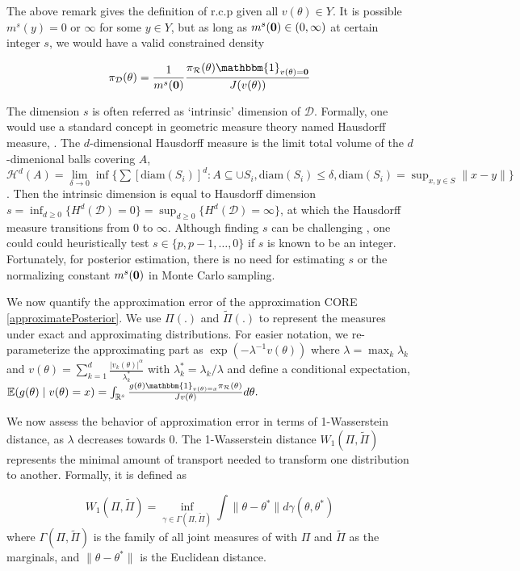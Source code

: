 \documentclass[10pt,fleqn]{article}
\newcommand{\be}{\begin{equation}\begin{aligned}}
\newcommand{\ee}{\end{aligned}\end{equation}}
\newcommand{\bb}[1]{\mathbb{#1}}
\newcommand{\mc}[1]{\mathcal{#1}}
\DeclareMathOperator{\1}{\mathbbm{1}}
\begin{document}
The above remark gives the definition of r.c.p given all $v(\theta)\in Y$. It is possible $m^s(y)=0$ or $\infty$ for some $y\in Y$, but as long as  $m^{s}({\bf 0})\in (0,\infty)$ at certain integer $s$, we would have a valid constrained density 

\be 
\pi_{\mc D}(\theta)=
\frac{1}{m^{s}({\bf 0})}  \frac{\pi_{\mc
R}(\theta) \mathbbm{1}_{v({\theta})={\bf 0}}}{J(v(\theta))}
\ee 

The dimension $s$ is often referred as `intrinsic' dimension of $\mc D$. Formally, one would use a standard concept in geometric measure theory named Hausdorff measure,  \citep{federer2014geometric}. The $d$-dimensional Hausdorff measure is the limit total volume of the $d$-dimenional balls covering $A$, $\mc H^{d}(A)= \underset{\delta\rightarrow 0}\lim \inf \{ \sum \left[{\text{diam}(S_i)}\right]^d: {A\subseteq \cup S_i, \text{diam}(S_i)\le \delta}, \text{diam}(S_i)=\sup_{x,y\in S}\|x-y\|\}$. Then the intrinsic dimension is equal to Hausdorff dimension $s=\inf_{d\ge 0}\{H^d(\mc D)=0\}=\sup_{d\ge 0}\{H^d(\mc D)=\infty\}$, at which the Hausdorff measure transitions from $0$ to $\infty$. Although finding $s$ can be challenging \citep{mardia1975statistics,bowen1979hausdorff}, one could could heuristically test $s\in \{p,p-1,\ldots, 0\}$ if $s$ is known to be an integer. Fortunately, for posterior estimation, there is no need for estimating $s$ or the normalizing constant $m^{s}(\bf 0)$ in Monte Carlo sampling.

We now quantify the approximation error of the approximation CORE \eqref{approximatePosterior}. 
We use $\Pi(.)$ and $\tilde\Pi(.)$ to represent the measures under exact and approximating distributions. 
 For easier notation, we re-parameterize the approximating part as $\exp(-\lambda^{-1}  v(\theta))$ where $\lambda=\max_k \lambda_k$ and $v(\theta)=\sum_{k=1}^d\frac{|v_k(\theta)|^{\alpha}}{\lambda^*_k}$ with $\lambda^*_k=\lambda_k/\lambda$ and define a conditional expectation, $\mathbb{E}(g(\theta) \mid v(\theta)=x)=  \int_{\bb R^s } \frac{ g(\theta) \mathbbm{1}_{v(\theta)=x} \pi_{\mc R}(\theta)}{ J v(\theta) } d \theta.$

 We now assess the behavior of approximation error in terms of 1-Wasserstein distance, as $\lambda$ decreases towards $0$. The 1-Wasserstein distance $W_1(\Pi,\tilde\Pi)$ represents the minimal amount of transport needed to transform one distribution to another. Formally, it is defined as

$$W_1(\Pi,\tilde\Pi)=\underset{\gamma\in \Gamma(\Pi,\tilde\Pi)}{\inf}\int \|\theta-\theta^*\| d\gamma(\theta,\theta^*)$$ 
where $\Gamma(\Pi,\tilde\Pi)$ is the family of all joint measures of with $\Pi$ and $\tilde\Pi$ as the marginals, and $\|\theta-\theta^*\|$ is the
Euclidean distance.
\end{document}
